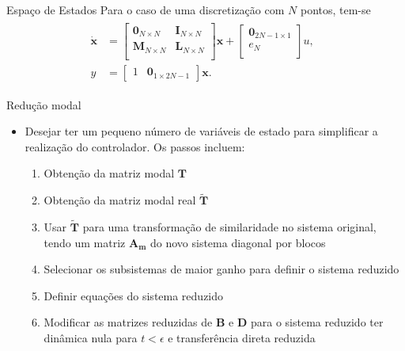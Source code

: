\documentclass[10pt]{beamer}
\begin{document}
\begin{frame}[fragile]{Espaço de Estados}
Para o caso de uma discretização com $N$ pontos, tem-se 
\begin{align}
\begin{array}{ll}
 	\dot{\mathbf{x}} &= \left[\begin{array}{cc}
	\mathbf{0}_{N\times N} & \mathbf{I}_{N\times N}\\
	\mathbf{M}_{N\times N} & \mathbf{L}_{N\times N}\\
\end{array}\right] \mathbf{x} + \left[\begin{array}{c}
	\mathbf{0}_{2N-1\times 1}\\ e_N\\
\end{array} \right]u,\;\;\\
y &= \left[\begin{array}{cc}
	1 & \textbf{0}_{1\times 2N-1}
\end{array}\right]\textbf{x}.
\end{array}
 \end{align}

\end{frame}

\begin{frame}[fragile]{Redução modal}
\begin{block}{}
\begin{itemize}
	\item Desejar ter um pequeno número de variáveis de estado para simplificar a realização do controlador. Os passos incluem:
		\begin{enumerate}
			\item Obtenção da matriz modal $\mathbf{T}$ \label{obtencaoT}
			\item Obtenção da matriz modal real $\tilde{\mathbf{T}}$ \label{obtencaoTReal}
			\item Usar $\tilde{\mathbf{T}}$ para uma transformação de similaridade no sistema original, tendo um matriz $\mathbf{A_m}$ do novo sistema diagonal por blocos \label{similaridadeTransformacao}
			\item Selecionar os subsistemas de maior ganho para definir o sistema reduzido \label{subsistemaReduzidoGanhos}
			\item Definir equações do sistema reduzido \label{sistemaReduzido}
			\item Modificar as matrizes reduzidas de $\mathbf{B}$ e $\mathbf{D}$ para o sistema reduzido ter dinâmica nula para $t < \epsilon$ e transferência direta reduzida \label{atrasonoSistemaReduzido}
		\end{enumerate}
\end{itemize}	
\end{block}

\end{frame}
\end{document}

